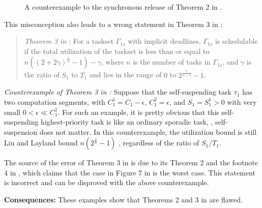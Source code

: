 \begin{figure}[t]
{}     
  \caption{A counterexample to the synchronous release of Theorem 2 in \cite{RTSS-KimANR13}.}
  \label{fig:counterexample-reduce-interf}
\end{figure}

This misconception also leads to a wrong statement in Theorem 3 in \cite{RTSS-KimANR13}:
\begin{quote}
{\it Theorem 3 in \cite{RTSS-KimANR13}}: For a taskset $\Gamma_{1s}$ with implicit deadlines, $\Gamma_{1s}$ is schedulable if the total utilization of the taskset is less than or equal to $n((2+2\gamma)^{\frac{1}{n}}-1)-\gamma$, where $n$ is the number of tasks in $\Gamma_{1s}$, and $\gamma$ is the ratio of
$S_1$ to $T_1$ and lies in the range of $0$ to $2^{\frac{1}{n-1}}-1$. 
\end{quote}


{\it Counterexample of Theorem 3 in \cite{RTSS-KimANR13}:} Suppose that the self-suspending task $\tau_1$ has two computation segments, with $C_1^1 = C_1-\epsilon$, $C_1^2 = \epsilon$, and $S_1=S_1^1 > 0$ with very small $0 < \epsilon \ll C_1^1$. For such an example, it is pretty obvious that this self-suspending highest-priority task is like an ordinary sporadic task, \ie, self-suspension does not matter. 
 In this counterexample, the utilization bound is still Liu and Layland bound $n(2^{\frac{1}{n}}-1)$ \cite{Liu_1973}, regardless of the ratio of $S_1/T_1$. 

The source of the error of Theorem 3 in \cite{RTSS-KimANR13} is due to its Theorem 2 and the footnote 4 in \cite{RTSS-KimANR13}, which claims that the case in Figure 7 in \cite{RTSS-KimANR13} is the worst case. This statement is incorrect and can be disproved with the above counterexample. 


{\bf Consequences:} These examples show that Theorems 2 and 3 in \cite{RTSS-KimANR13} are flawed.  

